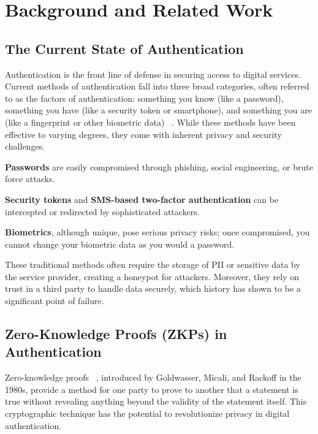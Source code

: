 \section{Background and Related Work}
\label{sec:relwork}

\subsection{The Current State of Authentication}
\label{subsec:auth}

Authentication is the front line of defense in securing access to digital services. Current methods of authentication fall into three broad categories, often referred to as the factors of authentication: something you know (like a password), something you have (like a security token or smartphone), and something you are (like a fingerprint or other biometric data) ~\cite{kizza2024auth}. While these methods have been effective to varying degrees, they come with inherent privacy and security challenges.

\begin{newitemize}
    \item \textbf{Passwords} are easily compromised through phishing, social engineering, or brute force attacks.
    \item \textbf{Security tokens} and \textbf{SMS-based two-factor authentication} can be intercepted or redirected by sophisticated attackers.
    \item \textbf{Biometrics}, although unique, pose serious privacy risks; once compromised, you cannot change your biometric data as you would a password.
\end{newitemize}

These traditional methods often require the storage of PII or sensitive data by the service provider, creating a honeypot for attackers. Moreover, they rely on trust in a third party to handle data securely, which history has shown to be a significant point of failure.

\subsection{Zero-Knowledge Proofs (ZKPs) in Authentication}
\label{subsec:zkp}

Zero-knowledge proofs ~\cite{goldwasser1989zkp}, introduced by Goldwasser, Micali, and Rackoff in the 1980s, provide a method for one party to prove to another that a statement is true without revealing anything beyond the validity of the statement itself. This cryptographic technique has the potential to revolutionize privacy in digital authentication.

